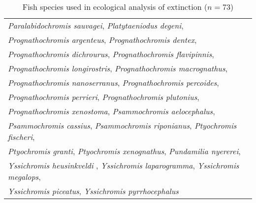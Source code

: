 \begin{table}[]
\begin{tabular}{l}
 \textit{Paralabidochromis sauvagei},  \textit{Platytaeniodus degeni},  \\
 \textit{Prognathochromis argenteus},  \textit{Prognathochromis dentex},  \\
 \textit{Prognathochromis dichrourus},  \textit{Prognathochromis flavipinnis},  \\
 \textit{Prognathochromis longirostris},  \textit{Prognathochromis macrognathus},  \\
 \textit{Prognathochromis nanoserranus},  \textit{Prognathochromis percoides},  \\
 \textit{Prognathochromis perrieri},  \textit{Prognathochromis plutonius},  \\
 \textit{Prognathochromis xenostoma},  \textit{Psammochromis aelocephalus},  \\
 \textit{Psammochromis cassius},  \textit{Psammochromis riponianus},  \textit{Ptyochromis fischeri},  \\
 \textit{Ptyochromis granti},  \textit{Ptyochromis xenognathus},  \textit{Pundamilia nyererei}, \\
 \textit{Yssichromis heusinkveldi },  \textit{Yssichromis laparogramma},  \textit{Yssichromis megalops},  \\
 \textit{Yssichromis piceatus},  \textit{Yssichromis pyrrhocephalus} \\ \bottomrule
\end{tabular}
\caption{Fish species used in ecological analysis of extinction ($n=73$)}
\label{FJ_table3}
\end{table}